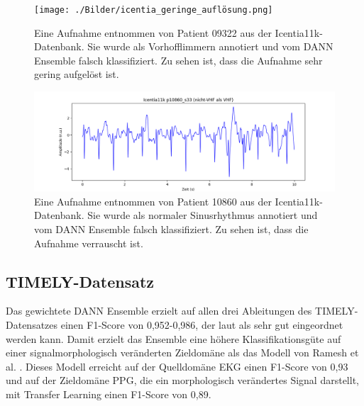 \begin{figure}[!ht]%
\centering
	\texttt{[image: ./Bilder/icentia\_geringe\_auflösung.png]}
\caption[Plot einer Icentia11k-Aufnahme mit geringer Auflösung]{Eine Aufnahme entnommen von Patient 09322 aus der Icentia11k-Datenbank. Sie wurde als Vorhofflimmern annotiert und vom \gls{DANN} Ensemble falsch klassifiziert. Zu sehen ist, dass die Aufnahme sehr gering aufgelöst ist.} 
\label{fig:icentia_plot}
\end{figure} 

\begin{figure}[!ht]%
\centering
	\includegraphics[width=1\textwidth]{./Bilder/icentia_verrauscht.png}
\caption[Plot einer verrauschten Icentia11k-Aufnahme]{Eine Aufnahme entnommen von Patient 10860 aus der Icentia11k-Datenbank. Sie wurde als normaler Sinusrhythmus annotiert und vom \gls{DANN} Ensemble falsch klassifiziert. Zu sehen ist, dass die Aufnahme verrauscht ist.} 
\label{fig:icentia_plot2}
\end{figure} 

\subsection*{TIMELY-Datensatz}

Das gewichtete \gls{DANN} Ensemble erzielt auf allen drei Ableitungen des TIMELY-Datensatzes einen F1-Score von 0,952-0,986, der laut \cite{plante_selection_1994} als sehr gut eingeordnet werden kann. Damit erzielt das Ensemble eine höhere Klassifikationsgüte auf einer signalmorphologisch veränderten Zieldomäne als das Modell von Ramesh et al. \cite{ramesh_atrial_2021}. Dieses Modell erreicht auf der Quelldomäne \gls{EKG} einen F1-Score von 0,93 und auf der Zieldomäne \gls{PPG}, die ein morphologisch verändertes Signal darstellt, mit Transfer Learning einen F1-Score von 0,89.


